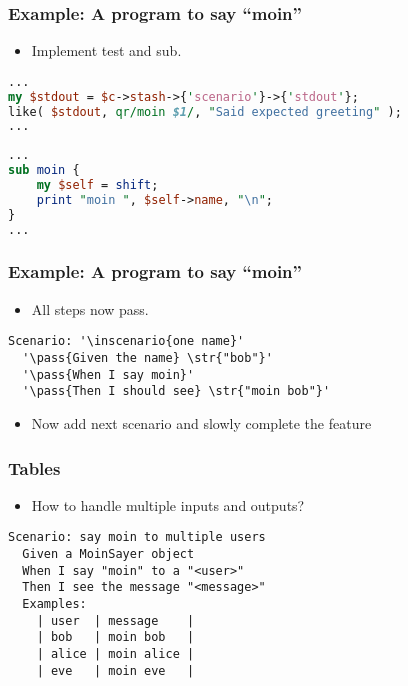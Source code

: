 \documentclass[10pt]{vcs_beamer}
\newcommand{\inscenario}[1]{\color{RoyalBlue}{#1}}
\newcommand{\str}[1]{\color{Turquoise}{#1}}
\newcommand{\pass}[1]{\color{ForestGreen}{#1}}
\begin{document}
\begin{frame}[fragile]
\frametitle{Example: A program to say ``moin''}

\begin{itemize}
    \item Implement  test and  sub.
\end{itemize}

\begin{lstlisting}[language=perl]
...
my $stdout = $c->stash->{'scenario'}->{'stdout'};
like( $stdout, qr/moin $1/, "Said expected greeting" );
...
\end{lstlisting}

\begin{lstlisting}[language=perl]
...
sub moin {
    my $self = shift;
    print "moin ", $self->name, "\n";
}
...
\end{lstlisting}

\end{frame}

\begin{frame}[fragile]
\frametitle{Example: A program to say ``moin''}

\begin{itemize}
    \item All steps now pass.
\end{itemize}

\begin{lstlisting}[escapeinside='']
Scenario: '\inscenario{one name}'
  '\pass{Given the name} \str{"bob"}'
  '\pass{When I say moin}'
  '\pass{Then I should see} \str{"moin bob"}'
\end{lstlisting}

\begin{itemize}
    \item Now add next scenario and slowly complete the feature
\end{itemize}

\end{frame}

\begin{frame}[fragile]
\frametitle{Tables}

\begin{itemize}
    \item How to handle multiple inputs and outputs?
\end{itemize}

\begin{lstlisting}
Scenario: say moin to multiple users
  Given a MoinSayer object
  When I say "moin" to a "<user>"
  Then I see the message "<message>"
  Examples:
    | user  | message    |
    | bob   | moin bob   |
    | alice | moin alice |
    | eve   | moin eve   |
\end{lstlisting}

\end{frame}
\end{document}
